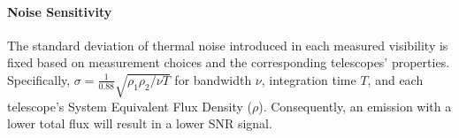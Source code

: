 %			
%			
%			


\vspace{-.15in}
\paragraph{Noise Sensitivity} The standard deviation of thermal noise introduced in each measured visibility is fixed based on measurement choices and the corresponding telescopes' properties. Specifically, $\sigma = \frac{1}{0.88} \sqrt{ {\rho_1 \rho_2 }/{ \nu T } } $ for bandwidth $\nu$, integration time $T$, and each telescope's System Equivalent Flux Density ($\rho$).
Consequently, an emission with a lower total flux will result in a lower SNR signal.


